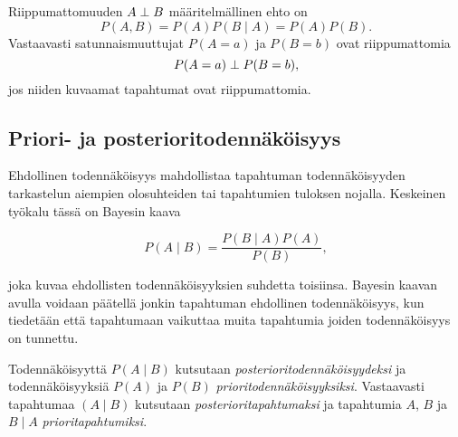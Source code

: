 Riippumattomuuden $A \perp B$ määritelmällinen ehto on 
$$ 
    P(A,B) = P(A)P(B \mid A) = P(A)P(B).  
$$  
Vastaavasti satunnaismuuttujat $P(A = a)$ ja $P(B = b)$ ovat riippumattomia  
$$ 
    P(A = a)  \perp P(B = b), 
$$ 
jos niiden kuvaamat tapahtumat ovat riippumattomia.  

\subsection{Priori- ja posterioritodennäköisyys} 

Ehdollinen todennäköisyys mahdollistaa tapahtuman todennäköisyyden tarkastelun aiempien olosuhteiden tai tapahtumien tuloksen nojalla. Keskeinen työkalu tässä on Bayesin kaava

\begin{equation}\label{eq:bayes} 
        P(A \mid B) = \frac{P(B \mid A)P(A)}{P(B)}, 
\end{equation} 

joka kuvaa ehdollisten todennäköisyyksien suhdetta toisiinsa. Bayesin kaavan avulla voidaan päätellä jonkin tapahtuman ehdollinen todennäköisyys, kun tiedetään että tapahtumaan vaikuttaa muita tapahtumia joiden todennäköisyys on tunnettu. 

Todennäköisyyttä $P(A \mid B)$ kutsutaan \emph{posterioritodennäköisyydeksi} ja todennäköisyyksiä $P(A)$ ja $P(B)$ \emph{prioritodennäköisyyksiksi}. Vastaavasti tapahtumaa $(A \mid B)$ kutsutaan \emph{posterioritapahtumaksi} ja tapahtumia $A$, $B$ ja $B \mid A$ \emph{prioritapahtumiksi}. 